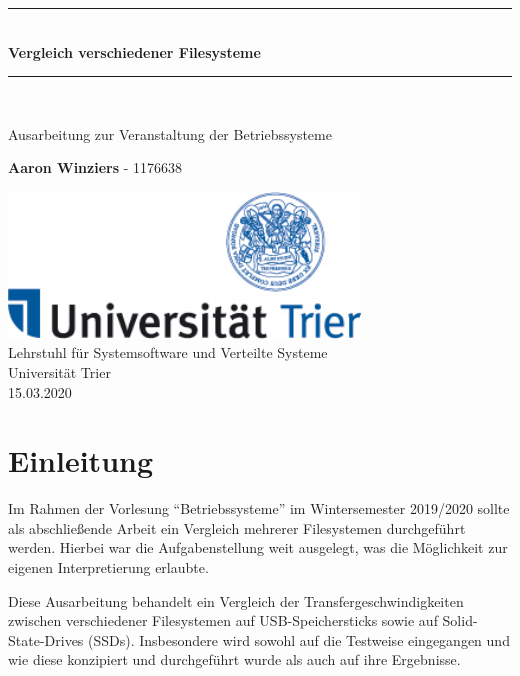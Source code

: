 \documentclass[11pt,parskip=full]{scrartcl}
\newcommand{\HRule}[1]{\rule{\linewidth}{#1}}
\begin{document}
	
\begin{titlepage}
	\begin{center}
		\vspace*{2cm}
		\HRule{1pt} \\
		\vspace{.5 cm}
		\textbf{\Huge Vergleich verschiedener Filesysteme}
		\HRule{2pt} \\ [1cm]
		
		\vspace{1.5cm}
		
		\Large{
			Ausarbeitung zur Veranstaltung der Betriebssysteme
		}
		\vspace{1.5cm}
		
		\textbf{\Large Aaron Winziers} - \large 1176638
		
		\vfill
		
		\includegraphics[width=0.7\textwidth]{Logo-Uni-Trier}\\
		[1cm]
		Lehrstuhl für Systemsoftware und Verteilte Systeme\\
		Universität Trier\\
		15.03.2020
		
	\end{center}
\end{titlepage}
\newpage
	
\section{Einleitung}

	Im Rahmen der Vorlesung ``Betriebssysteme'' im Wintersemester 2019/2020 sollte als abschließende Arbeit ein Vergleich mehrerer Filesystemen durchgeführt werden. Hierbei war die Aufgabenstellung weit ausgelegt, was die Möglichkeit zur eigenen Interpretierung erlaubte.
	
	Diese Ausarbeitung behandelt ein Vergleich der Transfergeschwindigkeiten zwischen verschiedener Filesystemen auf USB-Speichersticks sowie auf Solid-State-Drives (SSDs). Insbesondere wird sowohl auf die Testweise eingegangen und wie diese konzipiert und durchgeführt wurde als auch auf ihre Ergebnisse.
\end{document}

